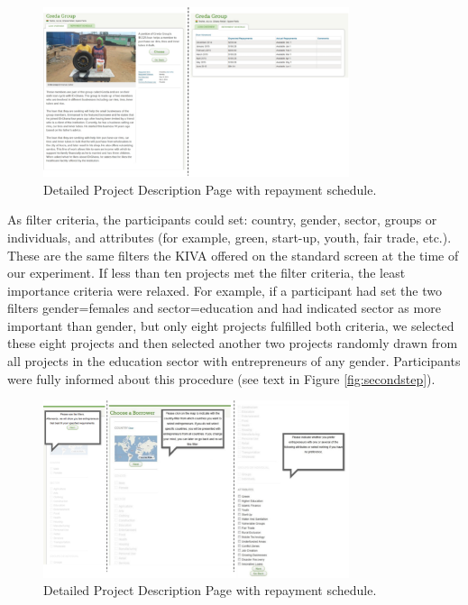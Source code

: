 \begin{figure}[h]
    \centering
    \includegraphics[width=0.8\textwidth]{graphics/Bild2}
    \caption{ Detailed Project Description Page with repayment schedule.}
    \label{fig:procedure1}
\end{figure}
As filter
criteria, the participants could set: country, gender, sector, groups or
individuals, and attributes (for example, green, start-up, youth, fair trade,
etc.). These are the same filters the KIVA offered on the standard screen at
the time of our experiment. If less than ten projects met the filter criteria,
the least importance criteria were relaxed. For example, if a participant had
set the two filters gender=females and sector=education and had indicated
sector as more important than gender, but only eight projects fulfilled both
criteria, we selected these eight projects and then selected another two
projects randomly drawn from all projects in the education sector with
entrepreneurs of any gender. Participants were fully informed about this procedure
(see text in Figure \ref{fig:secondstep}).\\
\begin{figure}[h]
    \centering
    \includegraphics[width=0.8\textwidth]{graphics/Bild3.png}
    \caption{ Detailed Project Description Page with repayment schedule.}
    \label{fig:firststep}
\end{figure}

